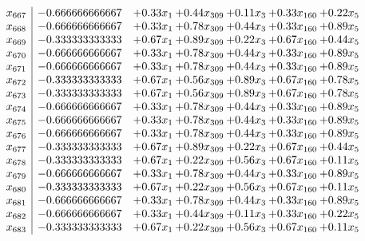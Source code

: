\documentclass[8pt]{article}
\begin{document}
\[\begin{array}{c| c c@{\hskip 2pt} c@{\hskip 2pt} c@{\hskip 2pt} c@{\hskip 2pt} c@{\hskip 2pt} }
 x_{667}   &  -0.666666666667 & +  0.33 x_{1} & +  0.44 x_{309} & +  0.11 x_{3} & +  0.33 x_{160} & +  0.22 x_{5}\\
 x_{668}   &  -0.666666666667 & +  0.33 x_{1} & +  0.78 x_{309} & +  0.44 x_{3} & +  0.33 x_{160} & +  0.89 x_{5}\\
 x_{669}   &  -0.333333333333 & +  0.67 x_{1} & +  0.89 x_{309} & +  0.22 x_{3} & +  0.67 x_{160} & +  0.44 x_{5}\\
 x_{670}   &  -0.666666666667 & +  0.33 x_{1} & +  0.78 x_{309} & +  0.44 x_{3} & +  0.33 x_{160} & +  0.89 x_{5}\\
 x_{671}   &  -0.666666666667 & +  0.33 x_{1} & +  0.78 x_{309} & +  0.44 x_{3} & +  0.33 x_{160} & +  0.89 x_{5}\\
 x_{672}   &  -0.333333333333 & +  0.67 x_{1} & +  0.56 x_{309} & +  0.89 x_{3} & +  0.67 x_{160} & +  0.78 x_{5}\\
 x_{673}   &  -0.333333333333 & +  0.67 x_{1} & +  0.56 x_{309} & +  0.89 x_{3} & +  0.67 x_{160} & +  0.78 x_{5}\\
 x_{674}   &  -0.666666666667 & +  0.33 x_{1} & +  0.78 x_{309} & +  0.44 x_{3} & +  0.33 x_{160} & +  0.89 x_{5}\\
 x_{675}   &  -0.666666666667 & +  0.33 x_{1} & +  0.78 x_{309} & +  0.44 x_{3} & +  0.33 x_{160} & +  0.89 x_{5}\\
 x_{676}   &  -0.666666666667 & +  0.33 x_{1} & +  0.78 x_{309} & +  0.44 x_{3} & +  0.33 x_{160} & +  0.89 x_{5}\\
 x_{677}   &  -0.333333333333 & +  0.67 x_{1} & +  0.89 x_{309} & +  0.22 x_{3} & +  0.67 x_{160} & +  0.44 x_{5}\\
 x_{678}   &  -0.333333333333 & +  0.67 x_{1} & +  0.22 x_{309} & +  0.56 x_{3} & +  0.67 x_{160} & +  0.11 x_{5}\\
 x_{679}   &  -0.666666666667 & +  0.33 x_{1} & +  0.78 x_{309} & +  0.44 x_{3} & +  0.33 x_{160} & +  0.89 x_{5}\\
 x_{680}   &  -0.333333333333 & +  0.67 x_{1} & +  0.22 x_{309} & +  0.56 x_{3} & +  0.67 x_{160} & +  0.11 x_{5}\\
 x_{681}   &  -0.666666666667 & +  0.33 x_{1} & +  0.78 x_{309} & +  0.44 x_{3} & +  0.33 x_{160} & +  0.89 x_{5}\\
 x_{682}   &  -0.666666666667 & +  0.33 x_{1} & +  0.44 x_{309} & +  0.11 x_{3} & +  0.33 x_{160} & +  0.22 x_{5}\\
 x_{683}   &  -0.333333333333 & +  0.67 x_{1} & +  0.22 x_{309} & +  0.56 x_{3} & +  0.67 x_{160} & +  0.11 x_{5}\\

\end{array}\]
\end{document}
